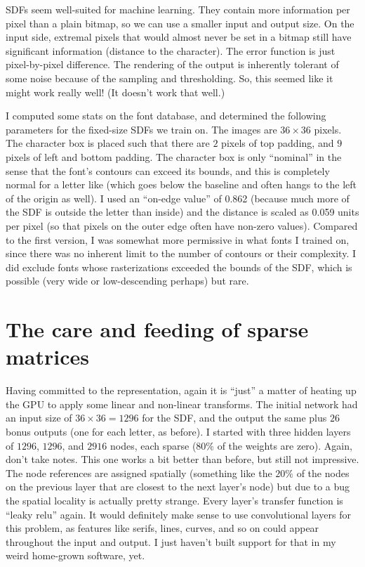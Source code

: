 \documentclass[twocolumn]{article}
\begin{document}
SDFs seem well-suited for machine learning. They contain more
information per pixel than a plain bitmap, so we can use a smaller
input and output size. On the input side, extremal pixels that would
almost never be set in a bitmap still have significant information
(distance to the character). The error function is just pixel-by-pixel
difference. The rendering of the output is inherently tolerant of some
noise because of the sampling and thresholding. So, this seemed like
it might work really well! (It doesn't work that well.)

I computed some stats on the font database, and determined the
following parameters for the fixed-size SDFs we train on. The images
are $36 \times 36$ pixels. The character box is placed such that there
are $2$ pixels of top padding, and $9$ pixels of left and bottom
padding. The character box is only ``nominal'' in the sense that the
font's contours can exceed its bounds, and this is completely normal
for a letter like  (which goes below the baseline and
often hangs to the left of the origin as well). I used an ``on-edge
value'' of 0.862 (because much more of the SDF is outside the letter
than inside) and the distance is scaled as 0.059 units per pixel (so
that pixels on the outer edge often have non-zero values). Compared to
the first version, I was somewhat more permissive in what fonts I
trained on, since there was no inherent limit to the number of
contours or their complexity. I did exclude fonts whose rasterizations
exceeded the bounds of the SDF, which is possible (very wide
 or low-descending  perhaps) but rare.

\section{The care and feeding of sparse matrices} \label{sec:neural}

Having committed to the representation, again it is ``just'' a matter
of heating up the GPU to apply some linear and non-linear transforms.
The initial network had an input size of $36 \times 36 = 1296$ for the
SDF, and the output the same plus $26$ bonus outputs (one for each
letter, as before). I started with three hidden layers of $1296$, $1296$,
and $2916$ nodes, each sparse ($80\%$ of the weights are zero). Again,
don't take notes. This one works a bit better than before, but still
not impressive. The node references are assigned spatially (something
like the $20\%$ of the nodes on the previous layer that are closest to
the next layer's node) but due to a bug the spatial locality is
actually pretty strange.
Every layer's transfer function is ``leaky relu'' again. It would
definitely make sense to use convolutional layers for this problem, as
features like serifs, lines, curves, and so on could appear throughout
the input and output. I just haven't built support for that in my
weird home-grown software, yet.
\end{document}
